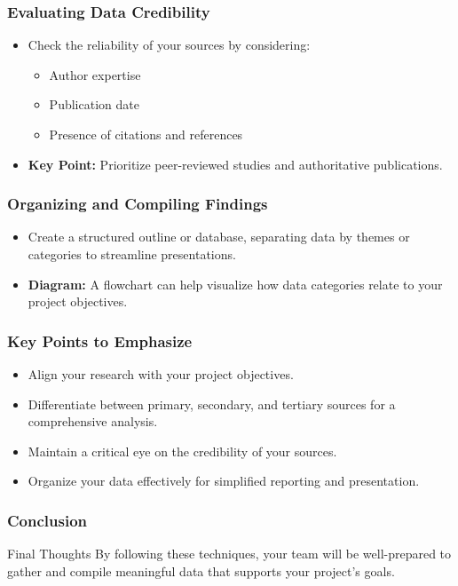 \documentclass[aspectratio=169]{beamer}
\begin{document}
\begin{frame}[fragile]
    \frametitle{Evaluating Data Credibility}
    \begin{itemize}
        \item Check the reliability of your sources by considering:
        \begin{itemize}
            \item Author expertise
            \item Publication date
            \item Presence of citations and references
        \end{itemize}
        \item \textbf{Key Point:} Prioritize peer-reviewed studies and authoritative publications.
    \end{itemize}
\end{frame}

\begin{frame}[fragile]
    \frametitle{Organizing and Compiling Findings}
    \begin{itemize}
        \item Create a structured outline or database, separating data by themes or categories to streamline presentations.
        \item \textbf{Diagram:} A flowchart can help visualize how data categories relate to your project objectives.
    \end{itemize}
\end{frame}

\begin{frame}[fragile]
    \frametitle{Key Points to Emphasize}
    \begin{itemize}
        \item Align your research with your project objectives.
        \item Differentiate between primary, secondary, and tertiary sources for a comprehensive analysis.
        \item Maintain a critical eye on the credibility of your sources.
        \item Organize your data effectively for simplified reporting and presentation.
    \end{itemize}
\end{frame}

\begin{frame}[fragile]
    \frametitle{Conclusion}
    \begin{block}{Final Thoughts}
        By following these techniques, your team will be well-prepared to gather and compile meaningful data that supports your project’s goals.
    \end{block}
\end{frame}
\end{document}
